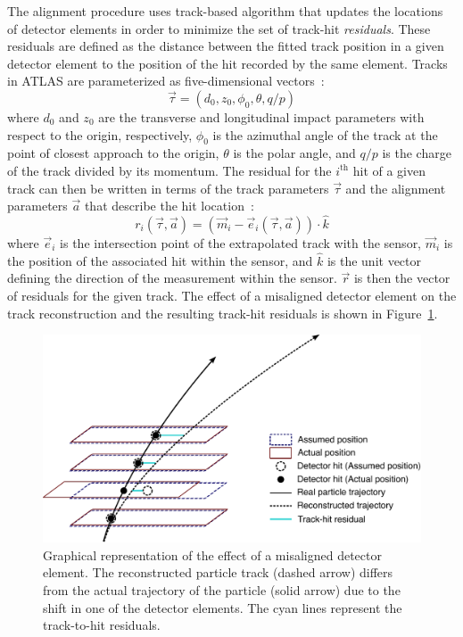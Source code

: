
The alignment procedure uses track-based algorithm that updates the locations of detector elements in order to minimize the set of track-hit \emph{residuals}.
These residuals are defined as the distance between the fitted track position in a given detector element to the position of the hit recorded by the same element.
Tracks in ATLAS are parameterized as five-dimensional vectors~\cite{2006.atlas-tracking-model}:%
\begin{equation}
  \vec{\tau} = (d_0,z_0,\phi_0,\theta,q/p)
\end{equation}
where $d_0$ and $z_0$ are the transverse and longitudinal impact parameters with respect to the origin, respectively, $\phi_0$ is the azimuthal angle of the track at the point of closest approach to the origin, $\theta$ is the polar angle, and $q/p$ is the charge of the track divided by its momentum.
The residual for the $i^{\textrm{th}}$ hit of a given track can then be written in terms of the track parameters $\vec{\tau}$ and the alignment parameters $\vec{a}$ that describe the hit location~\cite{2005.global-chi2-alignment}:
\begin{equation}
  r_i(\vec{\tau},\vec{a}) = (\vec{m}_i - \vec{e}_i (\vec{\tau},\vec{a}))\cdot\hat{k}
\end{equation}
where $\vec{e}_i$ is the intersection point of the extrapolated track with the sensor, $\vec{m}_i$ is the position of the associated hit within the sensor, and $\hat{k}$ is the unit vector defining the direction of the measurement within the sensor.
$\vec{r}$ is then the vector of residuals for the given track.
The effect of a misaligned detector element on the track reconstruction and the resulting track-hit residuals is shown in Figure~\ref{fig:alignment_effects_misalign}. 

\begin{figure}[htbp]
  \centering
  \includegraphics[width=.8\textwidth]{figs/alignment/misalignment}
  \caption{Graphical representation of the effect of a misaligned detector element.  The reconstructed particle track (dashed arrow) differs from the actual trajectory of the particle (solid arrow) due to the shift in one of the detector elements.  The cyan lines represent the track-to-hit residuals.}
  \label{fig:alignment_effects_misalign}
\end{figure}

